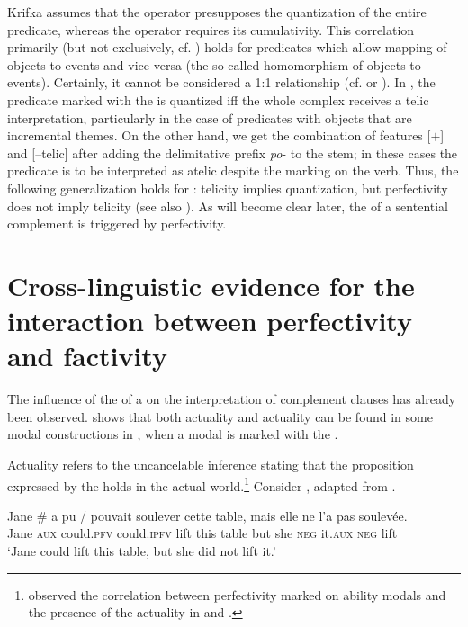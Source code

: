 \documentclass[output=paper,  modfonts,  newtxmath,  hidelinks		  ]{langscibook}
\begin{document}
Krifka assumes that the  operator presupposes the quantization of the entire predicate, whereas the  operator requires its cumulativity. This correlation primarily (but not exclusively, cf. \citealt{Krifka1998}) holds for predicates which allow mapping of objects to events and vice versa (the so-called homomorphism of objects to events). Certainly, it cannot be considered a 1:1 relationship (cf. \citealt{Filip1996,Filip2005} or \citealt{Borik2006}). In , the  predicate marked with the  is quantized iff the whole  complex receives a telic interpretation, particularly in the case of predicates with  objects that are incremental themes. On the other hand, we get the combination of features [$+$] and [$–$telic] after adding the delimitative prefix \textit{po}- to the  stem; in these cases the predicate is to be interpreted as atelic despite the  marking on the verb. Thus, the following generalization holds for : telicity implies quantization, but perfectivity does not imply telicity (see also \citealt{Gehrke2008}). As will become clear later, the  of a sentential complement is triggered by perfectivity.

\section{Cross-linguistic evidence for the interaction between perfectivity and factivity}

The influence of the  of a  on the  interpretation of complement clauses has already been observed. \cite{Hacquard2006} shows that both actuality  and actuality  can be found in some modal constructions in , when a modal is marked with the .\par Actuality  refers to the uncancelable inference stating that the proposition expressed by the  holds in the actual world.\footnote{\cite{Bhatt1999} observed the correlation between perfectivity marked on ability modals and the presence of the actuality  in  and .} Consider , adapted from \cite[21]{Hacquard2006}.

\ea\label{21:10}
\gll Jane {\#}\hspace{-2pt} a pu / pouvait soulever cette table, mais elle ne l’a pas soulevée. \\
    Jane {} \textsc{aux} could.\textsc{pfv} {} could.\textsc{ipfv} lift this table but she \textsc{neg} it.\textsc{aux} \textsc{neg} lift\\
\glt	`Jane could lift this table, but she did not lift it.'
\z
\end{document}
